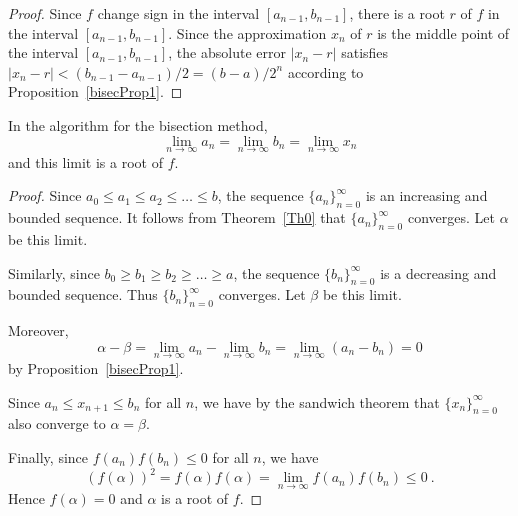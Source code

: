 \begin{proof}
Since $f$ change sign in the interval $[a_{n-1},b_{n-1}]$, there is a
root $r$ of $f$ in the interval $[a_{n-1},b_{n-1}]$.
Since the approximation $x_n$ of $r$ is the middle point of the
interval $[a_{n-1},b_{n-1}]$, the absolute error $|x_n - r |$ 
satisfies $|x_n - r | < (b_{n-1} - a_{n-1})/2 = (b-a)/2^n$ according
to Proposition~\ref{bisecProp1}.
\end{proof}

\begin{prop}
In the algorithm for the bisection method,
\[
\lim_{n\rightarrow \infty} a_n = \lim_{n\rightarrow \infty} b_n
= \lim_{n\rightarrow \infty} x_n
\]
and this limit is a root of $f$.
\end{prop}

\begin{proof}
Since $a_0 \leq a_1 \leq a_2 \leq \ldots \leq b$, the sequence
$\{a_n\}_{n=0}^\infty$ is an increasing and bounded sequence.  It
follows from Theorem~\ref{Th0} that $\{a_n\}_{n=0}^\infty$ converges.
Let $\alpha$ be this limit.

Similarly, since $b_0 \geq b_1 \geq b_2 \geq \ldots \geq a$, the sequence
$\{b_n\}_{n=0}^\infty$ is a decreasing and bounded sequence.  Thus
$\{b_n\}_{n=0}^\infty$ converges.  Let $\beta$ be this limit.

Moreover,
\[
\alpha - \beta = \lim_{n\rightarrow \infty} a_n
-\lim_{n\rightarrow \infty} b_n
= \lim_{n\rightarrow \infty} (a_n-b_n) = 0
\]
by Proposition~\ref{bisecProp1}.

Since $a_n \leq x_{n+1} \leq b_n$ for all $n$, we have by the sandwich
theorem that $\{x_n\}_{n=0}^\infty$ also converge to
$\alpha = \beta$.

Finally, since $f(a_n)f(b_n)\leq 0$ for all $n$, we have
\[
\left( f(\alpha) \right)^2 = f(\alpha)f(\alpha)
= \lim_{n\rightarrow \infty} f(a_n)f(b_n) \leq 0 \ .
\]
Hence $f(\alpha) = 0$ and $\alpha$ is a root of $f$.
\end{proof}

